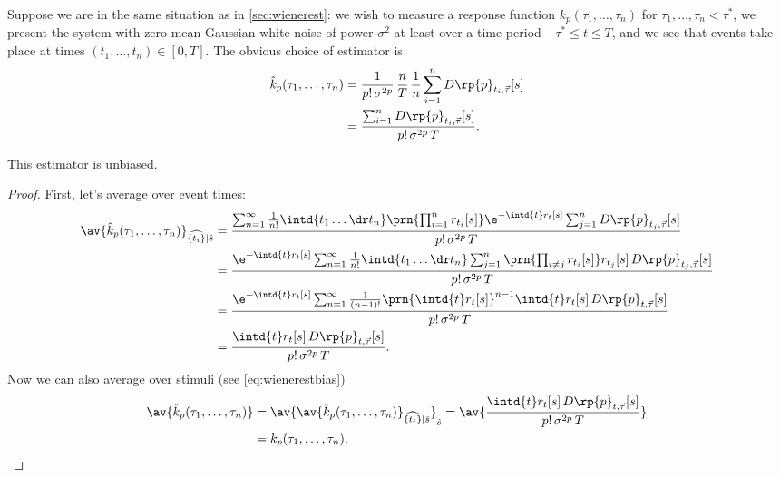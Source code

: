 \documentclass[12pt]{article}
\begin{document}
Suppose we are in the same situation as in \cref{sec:wienerest}: we wish to measure a response function $k_p(\tau_1,\ldots,\tau_n)$ for $\tau_1,\ldots,\tau_n < \tau^*$, we present the system with zero-mean Gaussian white noise of power $\sigma^2$ at least over a time period $-\tau^* \leq t \leq T$, and we see that events take place at times $(t_1,\ldots,t_n) \in [0,T]$.
The obvious choice of estimator is
%
\begin{equation}\label{eq:ratewienerest}
  \begin{aligned}
    \hat{k}_p(\tau_1,\ldots,\tau_n) &= \frac{1}{p!\,\sigma^{2p}} \, \frac{n}{T} \, \frac{1}{n} \sum_{i=1}^n D\rp{p}_{t_i,\vec{\tau}}[s] \\
      &= \frac{ \sum_{i=1}^n D\rp{p}_{t_i,\vec{\tau}}[s]}{p!\,\sigma^{2p}\,T}.
  \end{aligned}
\end{equation}
%

\begin{thm}
  This estimator is unbiased.
\end{thm}
\begin{proof}
  First, let's average over event times:
  \begin{equation*}
    \begin{aligned}
      \av{\hat{k}_p(\tau_1,\ldots,\tau_n)}_{\widehat{\{t_i\}}|\hat{s}}  &=
        \frac{\sum_{n=1}^\infty  \frac{1}{n!} \intd{t_1\ldots\dr t_n} \prn{\prod_{i=1}^n r_{t_i}[s]} \e^{-\intd{t}r_t[s]} \sum_{j=1}^n D\rp{p}_{t_j,\vec{\tau}}[s] }{ p! \, \sigma^{2p} \, T } \\
        &= \frac{\e^{-\intd{t}r_t[s]} \sum_{n=1}^\infty  \frac{1}{n!} \intd{t_1\ldots\dr t_n} \sum_{j=1}^n \prn{\prod_{i\neq j} r_{t_i}[s]} r_{t_j}[s] \, D\rp{p}_{t_j,\vec{\tau}}[s] }{ p! \, \sigma^{2p} \, T } \\
        &= \frac{\e^{-\intd{t}r_t[s]} \sum_{n=1}^\infty  \frac{1}{(n-1)!}  \prn{\intd{t} r_{t}[s]}^{n-1} \intd{t} r_{t}[s] \, D\rp{p}_{t,\vec{\tau}}[s] }{ p! \, \sigma^{2p} \, T } \\
        &= \frac{ \intd{t} r_{t}[s] \, D\rp{p}_{t,\vec{\tau}}[s] }{ p! \, \sigma^{2p} \, T } .
    \end{aligned}
  \end{equation*}
  Now we can also average over stimuli (see \eqref{eq:wienerestbias})
  \begin{equation*}
    \begin{aligned}
      \av{\hat{k}_p(\tau_1,\ldots,\tau_n)}  &=
        \av{ \av{\hat{k}_p(\tau_1,\ldots,\tau_n)}_{\widehat{\{t_i\}}|\hat{s}} }_{\hat{s}}
        = \av{ \frac{ \intd{t} r_{t}[s] \, D\rp{p}_{t,\vec{\tau}}[s] }{ p! \, \sigma^{2p} \, T } } \\
        &=  %
        k_p(\tau_1,\ldots,\tau_n).
    \end{aligned}
  \end{equation*}
\end{proof}
\end{document}
